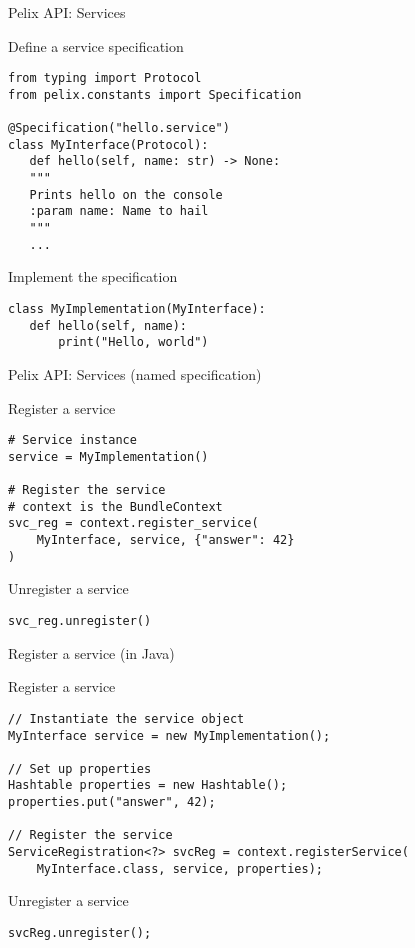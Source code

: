 \begin{frame}[fragile]{Pelix API: Services}
\begin{block}{Define a service specification}
\begin{verbatim}
from typing import Protocol
from pelix.constants import Specification

@Specification("hello.service")
class MyInterface(Protocol):
   def hello(self, name: str) -> None:
   """
   Prints hello on the console
   :param name: Name to hail
   """
   ...
\end{verbatim}
\end{block}

\begin{block}{Implement the specification}
\begin{verbatim}
class MyImplementation(MyInterface):
   def hello(self, name):
       print("Hello, world")
\end{verbatim}
\end{block}
\end{frame}

\begin{frame}[fragile]{Pelix API: Services (named specification)}
\begin{block}{Register a service}
\begin{verbatim}
# Service instance
service = MyImplementation()

# Register the service
# context is the BundleContext
svc_reg = context.register_service(
    MyInterface, service, {"answer": 42}
)
\end{verbatim}
\end{block}

\begin{block}{Unregister a service}
\begin{verbatim}
svc_reg.unregister()
\end{verbatim}
\end{block}
\end{frame}

\begin{frame}[fragile]{Register a service (in Java)}
\begin{block}{Register a service}
\begin{verbatim}
// Instantiate the service object
MyInterface service = new MyImplementation();

// Set up properties
Hashtable properties = new Hashtable();
properties.put("answer", 42);

// Register the service
ServiceRegistration<?> svcReg = context.registerService(
	MyInterface.class, service, properties);
\end{verbatim}
\end{block}

\begin{block}{Unregister a service}
\begin{verbatim}
svcReg.unregister();
\end{verbatim}
\end{block}
\end{frame}
